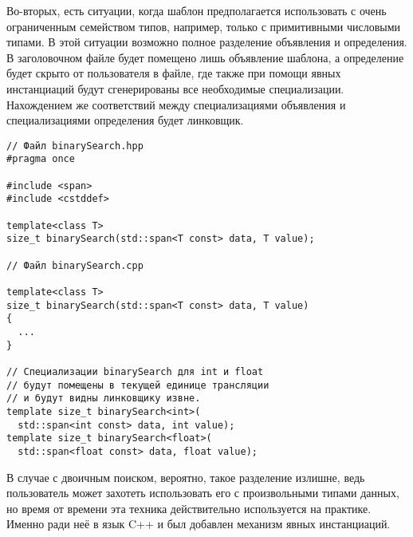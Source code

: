 Во-вторых, есть ситуации, когда шаблон предполагается использовать с очень ограниченным семейством типов, например, только с примитивными числовыми типами.
В этой ситуации возможно полное разделение объявления и определения.
В заголовочном файле будет помещено лишь объявление шаблона, а определение будет скрыто от пользователя в  файле, где также при помощи явных инстанциаций будут сгенерированы все необходимые специализации.
Нахождением же соответствий между специализациями объявления и специализациями определения будет линковщик.
\begin{verbatim}
// Файл binarySearch.hpp
#pragma once

#include <span>
#include <cstddef>

template<class T>
size_t binarySearch(std::span<T const> data, T value);

// Файл binarySearch.cpp

template<class T>
size_t binarySearch(std::span<T const> data, T value)
{
  ...
}

// Специализации binarySearch для int и float
// будут помещены в текущей единице трансляции
// и будут видны линковщику извне.
template size_t binarySearch<int>(
  std::span<int const> data, int value);
template size_t binarySearch<float>(
  std::span<float const> data, float value);
\end{verbatim}
В случае с двоичным поиском, вероятно, такое разделение излишне, ведь пользователь может захотеть использовать его с произвольными типами данных, но время от времени эта техника действительно используется на практике.
Именно ради неё в язык C++ и был добавлен механизм явных инстанциаций.

